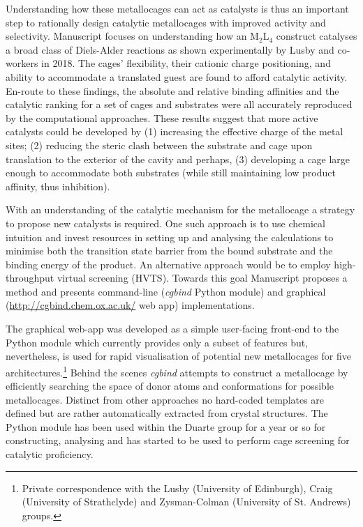 \documentclass[../../main.tex]{subfiles}
\begin{document}
Understanding how these metallocages can act as catalysts is thus an important step to rationally design catalytic metallocages with improved activity and selectivity. Manuscript  focuses on understanding how an M$_2$L$_4$ construct catalyses a broad class of Diels-Alder reactions as shown experimentally by Lusby and co-workers in 2018.\cite{MartCentelles2018} The cages' flexibility, their cationic charge positioning, and ability to accommodate a translated guest are found to afford catalytic activity. En-route to these findings, the absolute and relative binding affinities and the catalytic ranking for a set of cages and substrates were all accurately reproduced by the computational approaches. These results suggest that more active catalysts could be developed by (1) increasing the effective charge of the metal sites; (2) reducing the steric clash between the substrate and cage upon translation to the exterior of the cavity and perhaps, (3) developing a cage large enough to accommodate both substrates (while still maintaining low product affinity, thus inhibition).

With an understanding of the catalytic mechanism for the metallocage a strategy to propose new catalysts is required. One such approach is to use chemical intuition and invest resources in setting up and analysing the calculations to minimise both the transition state barrier from the bound substrate and the binding energy of the product. An alternative approach would be to employ high-throughput virtual screening (HVTS). Towards this goal Manuscript  proposes a method and presents command-line (\emph{cgbind} Python module) and graphical ({\url{http://cgbind.chem.ox.ac.uk/}} web app)  implementations.

The graphical web-app was developed as a simple user-facing front-end to the Python module which currently provides only a subset of features but, nevertheless, is used for rapid visualisation of potential new metallocages for five architectures.\footnote{Private correspondence with the Lusby (University of Edinburgh), Craig (University of Strathclyde) and Zysman-Colman (University of St. Andrews) groups.} Behind the scenes \emph{cgbind} attempts to construct a metallocage by efficiently searching the space of donor atoms and conformations for possible metallocages. Distinct from other approaches\cite{Turcani2018} no hard-coded templates are defined but are rather automatically extracted from crystal structures. The Python module has been used within the Duarte group for a year or so for constructing, analysing and has started to be used to perform cage screening for catalytic proficiency.

\clearpage
\end{document}
